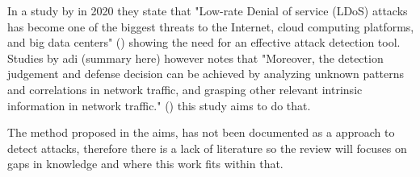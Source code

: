 In a study by \citeauthor{9016229} in 2020 they state that "Low-rate Denial of service (LDoS) attacks has become one of the biggest threats to the Internet, cloud computing platforms, and big data centers" (\cite{9016229}) showing the need for an effective attack detection tool. Studies by adi (summary here) however \citeauthor{9016229} notes that "Moreover, the detection judgement and defense decision can be achieved by analyzing unknown patterns and correlations in network traffic, and grasping other relevant intrinsic information in network traffic."  (\cite{9016229}) this study aims to do that.


The method proposed in the aims, has not been documented as a approach to detect attacks, therefore there is a lack of literature so the review will focuses on gaps in knowledge and where this work fits within that.

